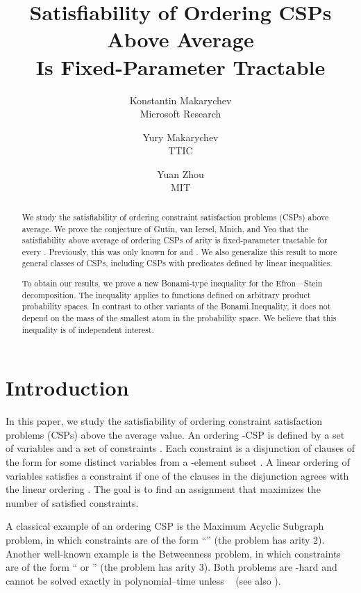 \documentclass[11pt]{article}
\title{Satisfiability of Ordering CSPs Above Average\\ Is Fixed-Parameter Tractable}
\author{Konstantin Makarychev \\Microsoft Research \and Yury Makarychev
\\TTIC \and Yuan Zhou \\ MIT}
\date{}
\begin{document}
\maketitle

\begin{abstract}
We study the satisfiability of ordering constraint satisfaction problems (CSPs) above average. We prove the conjecture of Gutin, van Iersel, Mnich, and Yeo that the satisfiability above average of ordering CSPs of arity  is fixed-parameter tractable for every . Previously, this was only known for  and . We also generalize this result to more general classes of CSPs, including CSPs with predicates defined by linear inequalities.

To obtain our results, we prove a new Bonami-type inequality for the Efron---Stein decomposition. The inequality applies to functions defined on arbitrary product
probability  spaces. In contrast to other variants of the Bonami Inequality, it does not depend on the mass of the smallest atom in the probability space. We believe that this inequality is of independent interest.
\end{abstract}

\section{Introduction}

In this paper, we study the satisfiability of ordering constraint satisfaction problems (CSPs) above the average value. An ordering -CSP
is defined by a set of variables  and a set of constraints . Each constraint 
is a disjunction of clauses of the form  for some distinct variables 
from a -element subset . A linear ordering  of variables  satisfies a constraint  if one of the clauses in the disjunction agrees with the linear ordering . The goal is to find an assignment  that maximizes the number of satisfied constraints.

A classical example of an ordering CSP is the Maximum Acyclic Subgraph problem,  in which constraints are of the form ``'' (the problem has arity 2). Another well-known example is the Betweenness problem, in which constraints are of the form `` or '' (the problem has arity 3). Both problems are -hard and cannot be solved exactly in polynomial--time unless ~\cite{Karp72, Opatrny79} (see also \cite{Seymour,CS,M-betw}).
\end{document}
